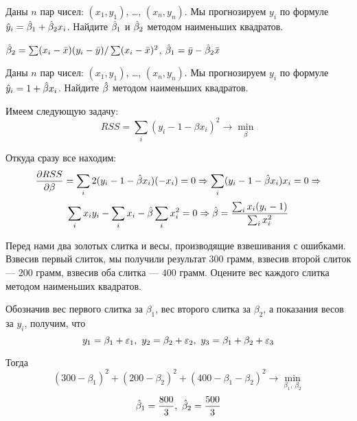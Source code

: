 \begin{problem} %
Даны $n$ пар чисел: $(x_1, y_1)$, \ldots, $(x_n,y_n)$. Мы прогнозируем $y_i$ по формуле $\hat{y}_i=\hat{\beta}_1+\hat{\beta}_2 x_i$. Найдите $\hat{\beta}_1$ и $\hat{\beta}_2$ методом наименьших квадратов.

\begin{sol}
$\hat{\beta}_2=\sum (x_i-\bar{x})(y_i-\bar{y})/\sum(x_i-\bar{x})^2$, $\hat{\beta}_1=\bar{y}-\hat{\beta}_2\bar{x}$
\end{sol}
\end{problem}


\begin{problem}%
Даны $n$ пар чисел: $(x_1, y_1)$, \ldots, $(x_n,y_n)$. Мы прогнозируем $y_i$ по формуле $\hat{y}_i=1+\hat{\beta} x_i$. Найдите $\hat{\beta}$ методом наименьших квадратов.

\begin{sol}
Имеем следующую задачу:
\[
RSS = \sum\limits_i(y_i-1-\beta x_i)^2 \rightarrow \min\limits_{\beta}
\]

Откуда сразу все находим:
\[
\frac{\partial RSS}{\partial \beta} = \sum\limits_i2(y_i-1-\hat{\beta} x_i)(-x_i) = 0 \Rightarrow \sum\limits_i (y_i-1-\hat{\beta} x_i)x_i=0 \Rightarrow
\]
\[
\sum\limits_i x_iy_i-\sum\limits_ix_i - \hat{\beta}\sum\limits_ix_i^2 = 0 \Rightarrow \hat{\beta} = \frac{\sum_ix_i(y_i-1)}{\sum_ix_i^2}
\]
\end{sol}
\end{problem}


\begin{problem} %
Перед нами два золотых слитка и весы, производящие взвешивания с ошибками. Взвесив первый слиток, мы получили результат $300$ грамм, взвесив второй слиток — $200$ грамм, взвесив оба слитка — $400$ грамм. Оцените вес каждого слитка методом наименьших квадратов.

\begin{sol}
Обозначив вес первого слитка за \(\beta_1\), вес второго слитка за \(\beta_2\), а показания весов за \(y_i\), получим, что
\[y_1 = \beta_1 + \varepsilon_1, \ y_2 = \beta_2 + \varepsilon_2, \ y_3 = \beta_1 + \beta_2 + \varepsilon_3\]

Тогда
\[(300 - \beta_1)^2 + (200 - \beta_2)^2 + (400 - \beta_1 - \beta_2)^2 \rightarrow \min \limits_{\beta_1,\  \beta_2} \]
\[\hat{\beta}_1 = \frac{800}{3}, \ \hat{\beta}_2 = \frac{500}{3} \]
\end{sol}
\end{problem}



